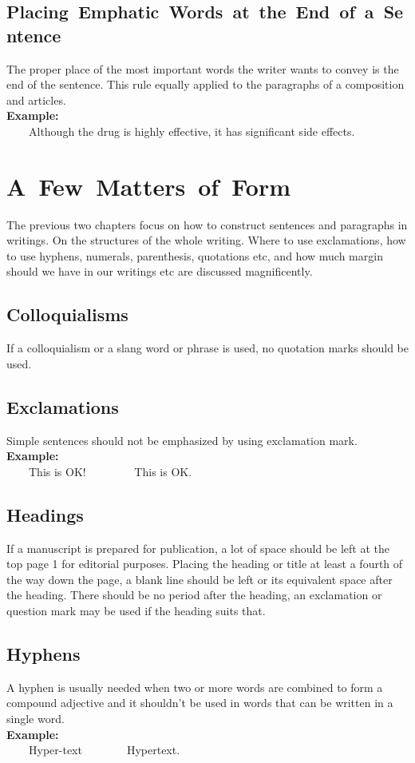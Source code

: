 \documentclass[12pt]{report}
\newcommand{\xmpl}{\textbf{Example:}\\} %
\newcommand{\indnt}{\ \ \ \ } %
\begin{document}
\section{\mbox{Placing Emphatic Words at the End of a Sentence}}
The proper place of the most important words the writer wants to convey is the end of the sentence. This rule equally applied to the paragraphs of a composition and articles.\\
\xmpl
\indnt Although the drug is highly effective, it has significant side effects.




\chapter{\mbox{A Few Matters of Form}}
The previous two chapters focus on how to construct sentences and paragraphs in writings. On the structures of the whole writing. Where to use exclamations, how to use hyphens, numerals, parenthesis, quotations etc, and how much margin should we have in our writings etc are discussed magnificently. 


\section{Colloquialisms}
If a colloquialism or a slang word or phrase is used, no quotation marks should be used.


\section{Exclamations}
Simple sentences should not be emphasized by using exclamation mark.\\
\xmpl
\indnt This is OK! \indnt \indnt This is OK.


\section{Headings}
If a manuscript is prepared for publication, a lot of space should be left at the top page 1 for editorial purposes. Placing the heading or title at least a fourth of the way down the page, a blank line should be left or its equivalent space after the heading. There should be no period after the heading, an exclamation or question mark may be used if the heading suits that.


\section{Hyphens}
A hyphen is usually needed when two or more words are combined to form a compound adjective and it shouldn't be used in words that can be written in a single word.\\
\xmpl
\indnt Hyper-text\indnt \indnt Hypertext.
\end{document}
